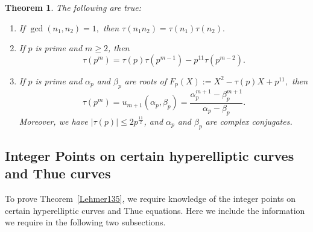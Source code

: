 \documentclass[12pt]{amsart}
\newtheorem{thm}{Theorem}[section]
\numberwithin{equation}{section}
\begin{document}
\begin{thm}\label{Newforms} 
The following are true:
\begin{enumerate}
\item If $\gcd(n_1,n_2)=1,$ then $\tau(n_1 n_2)=\tau(n_1)\tau(n_2).$
\item If $p$ is prime and $m\geq 2$, then
$$
\tau(p^m)=\tau(p)\tau(p^{m-1}) -p^{11}\tau(p^{m-2}).
$$
\item If $p$ is prime and $\alpha_p$ and $\beta_p$ are roots of $F_p(X):=X^2-\tau(p)X+p^{11},$ then
$$
   \tau(p^m)=u_{m+1}(\alpha_p,\beta_p)=\frac{\alpha_p^{m+1}-\beta_p^{m+1}}{\alpha_p-\beta_p}.
$$   
Moreover, we have $|\tau(p)|\leq 2p^{\frac{11}{2}}$, and $\alpha_p$ and $\beta_p$ are complex conjugates.
\end{enumerate}
\end{thm}



\subsection{Integer Points on certain hyperelliptic curves and Thue curves}\label{IntegerPoints}
To prove Theorem~\ref{Lehmer135}, we require knowledge of the integer points on certain hyperelliptic curves and Thue equations.
Here we include the information we require in the following two subsections.
\end{document}
